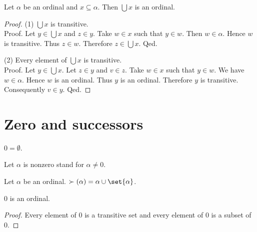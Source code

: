 \documentclass[../../set-theory/set-theory.tex]{subfiles}
\begin{document}
  \begin{forthel}
    \begin{proposition}
      Let $\alpha$ be an ordinal and $x \subseteq \alpha$.
      Then $\bigcup x$ is an ordinal.
    \end{proposition}
    \begin{proof}
      (1) $\bigcup x$ is transitive. \\
      Proof.
        Let $y \in \bigcup x$ and $z \in y$.
        Take $w \in x$ such that $y \in w$.
        Then $w \in \alpha$.
        Hence $w$ is transitive.
        Thus $z \in w$.
        Therefore $z \in \bigcup x$.
      Qed.

      (2) Every element of $\bigcup x$ is transitive. \\
      Proof.
        Let $y \in \bigcup x$.
        Let $z \in y$ and $v \in z$.
        Take $w \in x$ such that $y \in w$.
        We have $w \in \alpha$.
        Hence $w$ is an ordinal.
        Thus $y$ is an ordinal.
        Therefore $y$ is transitive.
        Consequently $v \in y$.
      Qed.
    \end{proof}
  \end{forthel}


  \section{Zero and successors}

  \begin{forthel}
    \begin{definition}
      $0 = \emptyset$.
    \end{definition}

    Let $\alpha$ is nonzero stand for $\alpha \neq 0$.
  \end{forthel}

  \begin{forthel}
    \begin{definition}
      Let $\alpha$ be an ordinal.
      $\succ(\alpha) = \alpha \cup \set{\alpha}$.
    \end{definition}
  \end{forthel}

  \begin{forthel}
    \begin{proposition}
      $0$ is an ordinal.
    \end{proposition}
    \begin{proof}
      Every element of $0$ is a transitive set and every element of $0$ is a
      subset of $0$.
    \end{proof}
  \end{forthel}
\end{document}
